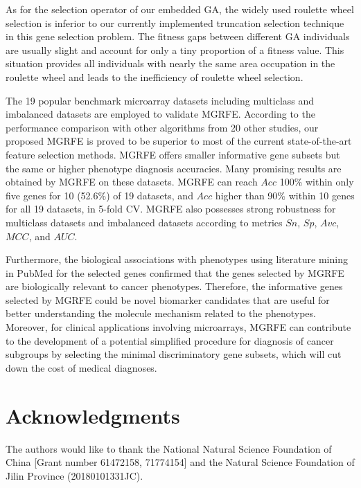 \documentclass[10pt,journal,compsoc]{IEEEtran}
\begin{document}
	As for the selection operator of our embedded GA, the widely used roulette wheel selection \cite{P37} is inferior to our currently implemented truncation selection technique in this gene selection problem. The fitness gaps between different GA individuals are usually slight and account for only a tiny proportion of a fitness value. This situation provides all individuals with nearly the same area occupation in the roulette wheel and leads to the inefficiency of roulette wheel selection. 
	
	The 19 popular benchmark microarray datasets including multiclass and imbalanced datasets are employed to validate MGRFE. According to the performance comparison with other algorithms from 20 other studies, our proposed MGRFE is proved to be superior to most of the current state-of-the-art feature selection methods. MGRFE offers smaller informative gene subsets but the same or higher phenotype diagnosis accuracies. Many promising results are obtained by MGRFE on these datasets. MGRFE can reach $Acc$ 100\% within only five genes for 10 (52.6\%) of 19 datasets, and $Acc$ higher than 90\% within 10 genes for all 19 datasets, in 5-fold CV. MGRFE also possesses strong robustness for multiclass datasets and imbalanced datasets according to metrics $Sn$, $Sp$, $Avc$, $MCC$, and $AUC$.
	
	Furthermore, the biological associations with phenotypes using literature mining in PubMed for the selected genes confirmed that the genes selected by MGRFE are biologically relevant to cancer phenotypes. Therefore, the informative genes selected by MGRFE could be novel biomarker candidates that are useful for better understanding the molecule mechanism related to the phenotypes. Moreover, for clinical applications involving microarrays, MGRFE can contribute to the development of a potential simplified procedure for diagnosis of cancer subgroups by selecting the minimal discriminatory gene subsets, which will cut down the cost of medical diagnoses.


\section*{Acknowledgments}

	The authors would like to thank the National Natural Science Foundation of China [Grant number 61472158, 71774154] and the Natural Science Foundation of Jilin Province (20180101331JC).
	


	
\end{document}
